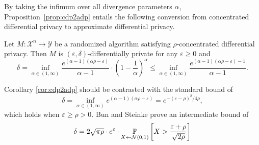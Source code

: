\documentclass{jpc}
\newcommand{\pr}[2]{{\ifx&#1& \mathbb{P} \else
\underset{#1}{\mathbb{P}} \fi \left[#2\right]}}
\newcommand{\eps}{\varepsilon}
\begin{document}
By taking the infimum over all divergence parameters $\alpha$, Proposition~\ref{prop:cdp2adp} entails the following conversion from concentrated differential privacy to approximate differential privacy.

\begin{cor}\label{cor:cdp2adp}
Let $M\colon \mathcal{X}^n \to \mathcal{Y}$ be a randomized algorithm satisfying $\rho$-concentrated differential privacy. 
Then $M$ is $(\eps,\delta)$-differentially private for any $\eps\ge0$ and
\begin{equation}
    \delta= \inf_{\alpha \in (1,\infty)} \frac{e^{(\alpha-1)(\alpha\rho-\eps)}}{\alpha-1} \cdot \left(1-\frac{1}{\alpha}\right)^\alpha \le \inf_{\alpha \in (1,\infty)} \frac{e^{(\alpha-1)(\alpha\rho-\eps)-1}}{\alpha-1}.\label{eq:cdp2adp}
\end{equation}
\end{cor}
Corollary \ref{cor:cdp2adp} should be contrasted with the standard bound \citep{DworkRV10,DworkR16,BunS16,Mironov17} of
\begin{equation}
    \delta = \inf_{\alpha \in (1,\infty)} e^{(\alpha-1)(\alpha\rho-\eps)} = e^{-(\eps-\rho)^2/4\rho},
\end{equation}
which holds when $\eps\ge\rho>0$. Bun and Steinke \cite{BunS16} prove an intermediate bound of
\begin{equation}
    \delta = 2\sqrt{\pi\rho} \cdot e^\eps \cdot \pr{X \gets \mathcal{N}(0,1)}{X>\frac{\eps+\rho}{\sqrt{2\rho}}}
\end{equation}
\end{document}
